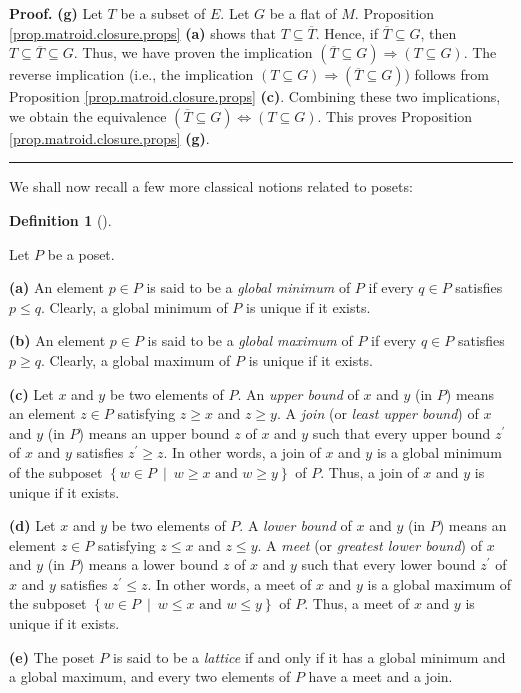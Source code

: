 \documentclass[numbers=enddot,12pt,final,onecolumn,notitlepage]{scrartcl}%
\theoremstyle{definition}
\newtheorem{defi}[theo]{Definition}
\newenvironment{definition}[1][]
{\begin{defi}[#1]\begin{leftbar}}
{\end{leftbar}\end{defi}}
\newenvironment{proof}[1][Proof]{\noindent\textbf{#1.} }{\ \rule{0.5em}{0.5em}}
\begin{document}
\begin{proof}
\textbf{(g)} Let $T$ be a subset of $E$. Let $G$ be a flat of $M$. Proposition
\ref{prop.matroid.closure.props} \textbf{(a)} shows that $T\subseteq
\overline{T}$. Hence, if $\overline{T}\subseteq G$, then $T\subseteq
\overline{T}\subseteq G$. Thus, we have proven the implication $\left(
\overline{T}\subseteq G\right)  \Longrightarrow\left(  T\subseteq G\right)  $.
The reverse implication (i.e., the implication $\left(  T\subseteq G\right)
\Longrightarrow\left(  \overline{T}\subseteq G\right)  $) follows from
Proposition \ref{prop.matroid.closure.props} \textbf{(c)}. Combining these two
implications, we obtain the equivalence $\left(  \overline{T}\subseteq
G\right)  \Longleftrightarrow\left(  T\subseteq G\right)  $. This proves
Proposition \ref{prop.matroid.closure.props} \textbf{(g)}.
\end{proof}

We shall now recall a few more classical notions related to posets:

\begin{definition}
\label{def.lattice}Let $P$ be a poset.

\textbf{(a)} An element $p\in P$ is said to be a \textit{global minimum} of
$P$ if every $q\in P$ satisfies $p\leq q$. Clearly, a global minimum of $P$ is
unique if it exists.

\textbf{(b)} An element $p\in P$ is said to be a \textit{global maximum} of
$P$ if every $q\in P$ satisfies $p\geq q$. Clearly, a global maximum of $P$ is
unique if it exists.

\textbf{(c)} Let $x$ and $y$ be two elements of $P$. An \textit{upper bound}
of $x$ and $y$ (in $P$) means an element $z\in P$ satisfying $z\geq x$ and
$z\geq y$. A \textit{join} (or \textit{least upper bound}) of $x$ and $y$ (in
$P$) means an upper bound $z$ of $x$ and $y$ such that every upper bound
$z^{\prime}$ of $x$ and $y$ satisfies $z^{\prime}\geq z$. In other words, a
join of $x$ and $y$ is a global minimum of the subposet $\left\{  w\in
P\ \mid\ w\geq x\text{ and }w\geq y\right\}  $ of $P$. Thus, a join of $x$ and
$y$ is unique if it exists.

\textbf{(d)} Let $x$ and $y$ be two elements of $P$. A \textit{lower bound} of
$x$ and $y$ (in $P$) means an element $z\in P$ satisfying $z\leq x$ and $z\leq
y$. A \textit{meet} (or \textit{greatest lower bound}) of $x$ and $y$ (in $P$)
means a lower bound $z$ of $x$ and $y$ such that every lower bound $z^{\prime
}$ of $x$ and $y$ satisfies $z^{\prime}\leq z$. In other words, a meet of $x$
and $y$ is a global maximum of the subposet $\left\{  w\in P\ \mid\ w\leq
x\text{ and }w\leq y\right\}  $ of $P$. Thus, a meet of $x$ and $y$ is unique
if it exists.

\textbf{(e)} The poset $P$ is said to be a \textit{lattice} if and only if it
has a global minimum and a global maximum, and every two elements of $P$ have
a meet and a join.
\end{definition}
\end{document}
